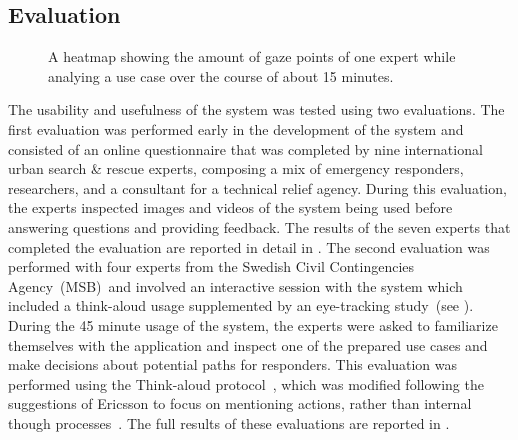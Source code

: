 \subsection{Evaluation} \label{contributions:usar:evaluation}
\begin{figure}
\caption{A heatmap showing the amount of gaze points of one expert while analying a use case over the course of about 15 minutes.}
\label{contributions:usar:system:heatmap}
\end{figure}

The usability and usefulness of the system was tested using two evaluations.  The first evaluation was performed early in the development of the system and consisted of an online questionnaire that was completed by nine international urban search \& rescue experts, composing a mix of emergency responders, researchers, and a consultant for a technical relief agency.  During this evaluation, the experts inspected images and videos of the system being used before answering questions and providing feedback.  The results of the seven experts that completed the evaluation are reported in detail in \paperVMV.  The second evaluation was performed with four experts from the Swedish Civil Contingencies Agency~(MSB)~and involved an interactive session with the system which included a think-aloud usage supplemented by an eye-tracking study~(see ).  During the 45 minute usage of the system, the experts were asked to familiarize themselves with the application and inspect one of the prepared use cases and make decisions about potential paths for responders.  This evaluation was performed using the Think-aloud protocol~\cite{lewis1993task}, which was modified following the suggestions of Ericsson to focus on mentioning actions, rather than internal though processes~\cite{ericsson1980verbal}.  The full results of these evaluations are reported in \paperCGF.





